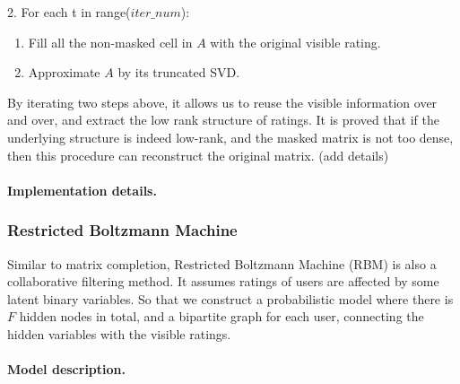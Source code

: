 \documentclass[bj, preprint]{imsart}
\begin{document}
2. For each t in range($iter\_num$): 
\begin{enumerate}
	\item Fill all the non-masked cell in $A$ with the original visible rating.
	\item Approximate $A$ by its truncated SVD. 
\end{enumerate}
By iterating two steps above, it allows us to reuse the visible information over and over, and extract the low rank structure of ratings. It is proved that if the underlying structure is indeed low-rank, and the masked matrix is not too dense, then this procedure can reconstruct the original matrix. (add details)

\paragraph{Implementation details.}\label{par:method.models.svd.impl}

\subsubsection{Restricted Boltzmann Machine}\label{subsubsec:method.models.rbm}
Similar to matrix completion, Restricted Boltzmann Machine (RBM) is also a collaborative filtering method. It assumes ratings of users are affected by some latent binary variables. So that we construct a probabilistic model where there is $F$ hidden nodes in total, and a bipartite graph for each user, connecting the hidden variables with the visible ratings. 

\paragraph{Model description.}\label{par:method.models.rbm.model}
\end{document}
